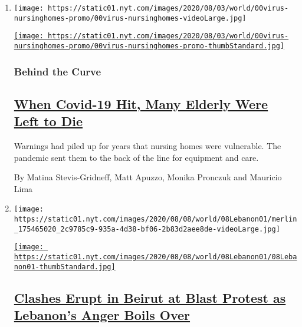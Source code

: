 \begin{enumerate}
\def\labelenumi{\arabic{enumi}.}
\item
  \texttt{[image: https://static01.nyt.com/images/2020/08/03/world/00virus-nursinghomes-promo/00virus-nursinghomes-videoLarge.jpg]}

  \href{/2020/08/08/world/europe/coronavirus-nursing-homes-elderly.html}{\texttt{[image: https://static01.nyt.com/images/2020/08/03/world/00virus-nursinghomes-promo/00virus-nursinghomes-promo-thumbStandard.jpg]}}

  \hypertarget{behind-the-curve}{%
  \subsubsection{Behind the Curve}\label{behind-the-curve}}

  \hypertarget{when-covid-19-hit-many-elderly-were-left-to-die}{%
  \subsection{\texorpdfstring{\href{/2020/08/08/world/europe/coronavirus-nursing-homes-elderly.html}{When
  Covid-19 Hit, Many Elderly Were Left to
  Die}}{When Covid-19 Hit, Many Elderly Were Left to Die}}\label{when-covid-19-hit-many-elderly-were-left-to-die}}

  Warnings had piled up for years that nursing homes were vulnerable.
  The pandemic sent them to the back of the line for equipment and care.

  By Matina Stevis-Gridneff, Matt Apuzzo, Monika Pronczuk and Mauricio
  Lima
\item
  \texttt{[image: https://static01.nyt.com/images/2020/08/08/world/08Lebanon01/merlin\_175465020\_2c9785c9-935a-4d38-bf06-2b83d2aee8de-videoLarge.jpg]}

  \href{/2020/08/08/world/middleeast/Beirut-explosion-protests-lebanon.html}{\texttt{[image: https://static01.nyt.com/images/2020/08/08/world/08Lebanon01/08Lebanon01-thumbStandard.jpg]}}

  \hypertarget{clashes-erupt-in-beirut-at-blast-protest-as-lebanons-anger-boils-over}{%
  \subsection{\texorpdfstring{\href{/2020/08/08/world/middleeast/Beirut-explosion-protests-lebanon.html}{Clashes
  Erupt in Beirut at Blast Protest as Lebanon's Anger Boils
  Over}}{Clashes Erupt in Beirut at Blast Protest as Lebanon's Anger Boils Over}}\label{clashes-erupt-in-beirut-at-blast-protest-as-lebanons-anger-boils-over}}


\end{enumerate}
